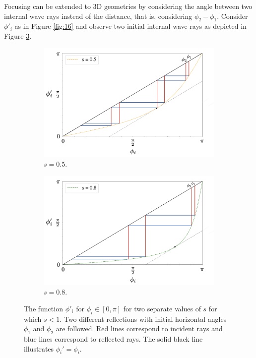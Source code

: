 \documentclass[a4paper]{article}
\numberwithin{equation}{section}
\begin{document}
Focusing can be extended to 3D geometries by considering the angle between two internal wave rays instead of the distance, that is, considering $\phi_2 - \phi_1$. Consider $\phi'_i$ as in Figure \ref{fig:16} and observe two initial internal wave rays as depicted in Figure \ref{fig:17}.
\begin{figure}[h!]
\centering
\begin{subfigure}[t]{.5\textwidth}
  \centering
  \includegraphics[width=1\linewidth]{Images/foc vs trap 2.PNG}
  \caption{$s = 0.5.$}
  \label{fig:sub1}
\end{subfigure}%
\begin{subfigure}[t]{.48\textwidth}
  \centering
  \includegraphics[width=1.05\linewidth]{Images/foc vs trap 1.PNG}
  \caption{$s = 0.8.$}
  \label{fig:a}
\end{subfigure}
\caption{The function $\phi'_i$ for $\phi_i \in [0, \pi]$ for two separate values of $s$ for which $s < 1$. Two different reflections with initial horizontal angles $\phi_1$ and $\phi_2$ are followed. Red lines correspond to incident rays and blue lines correspond to reflected rays. The solid black line illustrates $\phi_i' = \phi_i$. }
\label{fig:17}
\end{figure}
\end{document}
